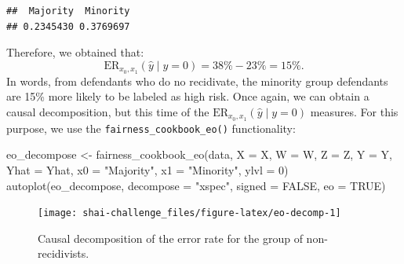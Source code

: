 \documentclass{article}
\newenvironment{Shaded}{\begin{snugshade}}{\end{snugshade}}
\newcommand{\AttributeTok}[1]{\textcolor[rgb]{0.77,0.63,0.00}{#1}}
\newcommand{\ConstantTok}[1]{\textcolor[rgb]{0.00,0.00,0.00}{#1}}
\newcommand{\DecValTok}[1]{\textcolor[rgb]{0.00,0.00,0.81}{#1}}
\newcommand{\FunctionTok}[1]{\textcolor[rgb]{0.00,0.00,0.00}{#1}}
\newcommand{\NormalTok}[1]{#1}
\newcommand{\OtherTok}[1]{\textcolor[rgb]{0.56,0.35,0.01}{#1}}
\newcommand{\SpecialCharTok}[1]{\textcolor[rgb]{0.00,0.00,0.00}{#1}}
\newcommand{\StringTok}[1]{\textcolor[rgb]{0.31,0.60,0.02}{#1}}
\begin{document}
\begin{Shaded}
\end{Shaded}

\begin{verbatim}
##  Majority  Minority 
## 0.2345430 0.3769697
\end{verbatim}

Therefore, we obtained that: \begin{equation}
\text{ER}_{x_0, x_1}(\hat{y} \mid y = 0) = 38\% - 23\% = 15\%.
\end{equation} In words, from defendants who do no recidivate, the
minority group defendants are 15\% more likely to be labeled as high
risk. Once again, we can obtain a causal decomposition, but this time of
the \(\text{ER}_{x_0, x_1}(\hat{y} \mid y = 0)\) measures. For this
purpose, we use the \texttt{fairness\_cookbook\_eo()} functionality:

\begin{Shaded}
\begin{Highlighting}[]
\NormalTok{eo\_decompose }\OtherTok{\textless{}{-}} \FunctionTok{fairness\_cookbook\_eo}\NormalTok{(data, }\AttributeTok{X =}\NormalTok{ X, }\AttributeTok{W =}\NormalTok{ W, }\AttributeTok{Z =}\NormalTok{ Z, }\AttributeTok{Y =}\NormalTok{ Y,}
                            \AttributeTok{Yhat =}\NormalTok{ Yhat, }\AttributeTok{x0 =} \StringTok{"Majority"}\NormalTok{, }\AttributeTok{x1 =} \StringTok{"Minority"}\NormalTok{,}
                            \AttributeTok{ylvl =} \DecValTok{0}\NormalTok{)}
\FunctionTok{autoplot}\NormalTok{(eo\_decompose, }\AttributeTok{decompose =} \StringTok{"xspec"}\NormalTok{, }\AttributeTok{signed =} \ConstantTok{FALSE}\NormalTok{, }\AttributeTok{eo =} \ConstantTok{TRUE}\NormalTok{)}
\end{Highlighting}
\end{Shaded}

\begin{figure}

{\centering \texttt{[image: shai-challenge\_files/figure-latex/eo-decomp-1]} 

}

\caption{Causal decomposition of the error rate for the group of non-recidivists.}\label{fig:eo-decomp}
\end{figure}
\end{document}
